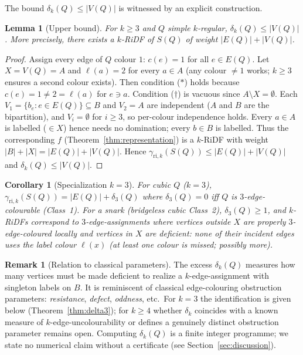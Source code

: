 \documentclass[11pt,a4paper]{article}
\theoremstyle{plain}
\newtheorem{lemma}[theorem]{Lemma}
\newtheorem{corollary}[theorem]{Corollary}
\theoremstyle{definition}
\newtheorem{remark}[theorem]{Remark}
\newcommand{\gri}{\gamma_{\mathrm{ri},k}}
\begin{document}
The bound $\delta_{k}(Q)\le|V(Q)|$ is witnessed by an explicit construction.

\begin{lemma}[Upper bound]\label{lem:upperbound}
For $k\ge3$ and $Q$ simple $k$-regular, $\delta_{k}(Q)\le|V(Q)|$. More precisely, there exists a $k$-RiDF of $S(Q)$ of weight $|E(Q)|+|V(Q)|$.
\end{lemma}
\begin{proof}
Assign every edge of $Q$ colour $1$: $c(e)=1$ for all $e\in E(Q)$. Let $X=V(Q)=A$ and $\ell(a)=2$ for every $a\in A$ (any colour $\neq1$ works; $k\ge3$ ensures a second colour exists). Then condition ($\ast$) holds because $c(e)=1\neq2=\ell(a)$ for $e\ni a$. Condition ($\dagger$) is vacuous since $A\setminus X=\emptyset$. Each $V_{1}=\{b_{e}:e\in E(Q)\}\subseteq B$ and $V_{2}=A$ are independent ($A$ and $B$ are the bipartition), and $V_{i}=\emptyset$ for $i\ge3$, so per-colour independence holds. Every $a\in A$ is labelled ($\in X$) hence needs no domination; every $b\in B$ is labelled. Thus the corresponding $f$ (Theorem~\ref{thm:representation}) is a $k$-RiDF with weight $|B|+|X|=|E(Q)|+|V(Q)|$. Hence $\gri(S(Q))\le|E(Q)|+|V(Q)|$ and $\delta_{k}(Q)\le|V(Q)|$.
\end{proof}

\begin{corollary}[Specialization $k=3$]\label{cor:k3}
For cubic $Q$ ($k=3$), $\gri(S(Q))=|E(Q)|+\delta_{3}(Q)$ where $\delta_{3}(Q)=0$ iff $Q$ is $3$-edge-colourable (Class~1). For a snark (bridgeless cubic Class~2), $\delta_{3}(Q)\ge1$, and $k$-RiDFs correspond to $3$-edge-assignments where vertices outside $X$ are properly $3$-edge-coloured locally and vertices in $X$ are deficient: none of their incident edges uses the label colour $\ell(x)$ (at least one colour is missed; possibly more).
\end{corollary}

\begin{remark}[Relation to classical parameters]
The excess $\delta_{k}(Q)$ measures how many vertices must be made deficient to realize a $k$-edge-assignment with singleton labels on $B$. It is reminiscent of classical edge-colouring obstruction parameters: \emph{resistance}, \emph{defect}, \emph{oddness}, etc.\ For $k=3$ the identification is given below (Theorem~\ref{thm:delta3}); for $k\ge4$ whether $\delta_{k}$ coincides with a known measure of $k$-edge-uncolourability or defines a genuinely distinct obstruction parameter remains open. Computing $\delta_{k}(Q)$ is a finite integer programme; we state no numerical claim without a certificate (see Section~\ref{sec:discussion}).
\end{remark}
\end{document}
